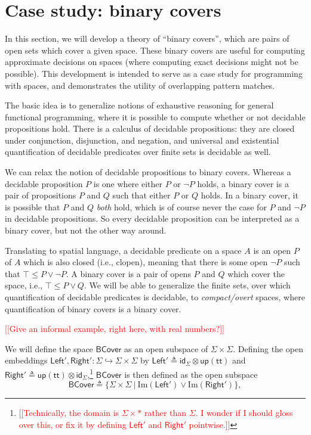\documentclass[conference]{IEEEtran}
\newcommand{\hookto}{\hookrightarrow}
\newcommand{\suchthat}{\ |\ }
\newcommand{\One}{\ast}
\newcommand{\Img}[1]{\text{Im}\left({#1}\right)}
\newcommand{\note}[1]{\textcolor{red}{[[{#1}]]}}
\newcommand{\strue}{\mathsf{up}(\mathsf{tt})}
\newcommand{\BCover}{\mathsf{BCover}}
\begin{document}
\section{Case study: binary covers}
\label{s:bcover}

In this section, we will develop a theory of ``binary covers'', which are pairs of open sets which cover a given space. These binary covers are useful for computing approximate decisions on spaces (where computing exact decisions might not be possible). This development is intended to serve as a case study for programming with spaces, and demonstrates the utility of overlapping pattern matches.

The basic idea is to generalize notions of exhaustive reasoning for general functional programming, where it is possible to compute whether or not decidable propositions hold. There is a calculus of decidable propositions: they are closed under conjunction, disjunction, and negation, and universal and existential quantification of decidable predicates over finite sets is decidable as well.

We can relax the notion of decidable propositions to binary covers. Whereas a decidable proposition $P$ is one where either $P$ or $\neg P$ holds, a binary cover is a pair of propositions $P$ and $Q$ such that either $P$ or $Q$ holds. In a binary cover, it is possible that $P$ and $Q$ \emph{both} hold, which is of course never the case for $P$ and $\neg P$ in decidable propositions. So every decidable proposition can be interpreted as a binary cover, but not the other way around.

Translating to spatial language, a decidable predicate on a space $A$ is an open $P$ of $A$ which is also closed (i.e., clopen), meaning that there is some open $\neg P$ such that $\top \le P \vee \neg P$. A binary cover is a pair of opens $P$ and $Q$ which cover the space, i.e., $\top \le P \vee Q$. We will be able to generalize the finite sets, over which quantification of decidable predicates is decidable, to \emph{compact/overt} spaces, where quantification of binary covers is a binary cover.

\note{Give an informal example, right here, with real numbers?}

We will define the space $\BCover$ as an open subspace of $\Sigma \times \Sigma$. Defining the open embeddings $\mathsf{Left}', \mathsf{Right}' : \Sigma \hookto \Sigma \times \Sigma$ by 
$\mathsf{Left}' \triangleq \mathsf{id}_\Sigma \otimes \strue$ and
$\mathsf{Right}' \triangleq \strue \otimes \mathsf{id}_\Sigma$,\footnote{\note{Technically, the domain is $\Sigma \times \One$ rather than $\Sigma$. I wonder if I should gloss over this, or fix it by defining $\mathsf{Left}'$ and $\mathsf{Right}'$ pointwise.}}
$\BCover$ is then defined as the open subspace
\[
\BCover \triangleq \{ \Sigma \times \Sigma \suchthat \Img{\mathsf{Left}'} \vee \Img{\mathsf{Right}'} \},
\]
\end{document}

